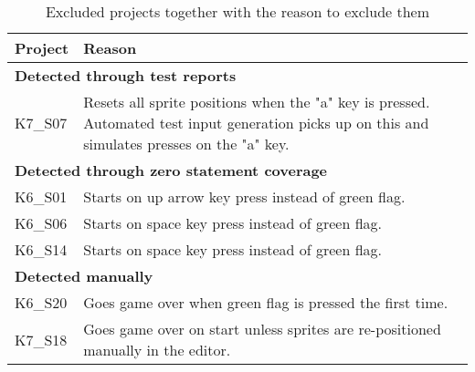 \begin{table}[htpb]
    \centering
    \scriptsize
    \begin{tabular}{lp{10.5cm}}
        \toprule
        Project & Reason                                                                           \\
        \midrule
        \multicolumn{2}{l}{\textbf{Detected through test reports}}                                 \\
        K7\_S07 & Resets all sprite positions when the "a" key is pressed.
                  Automated test input generation picks up on this and
                  simulates presses on the "a" key.                                                \\[1.4\bigskipamount]

        \multicolumn{2}{l}{\textbf{Detected through zero statement coverage}}                      \\
        K6\_S01 & Starts on up arrow key press instead of green flag.                              \\
        K6\_S06 & Starts on space key press instead of green flag.                                 \\
        K6\_S14 & Starts on space key press instead of green flag.                                 \\[\medskipamount]

        \multicolumn{2}{l}{\textbf{Detected manually}}                                             \\
        K6\_S20 & Goes game over when green flag is pressed the first time.                        \\
        K7\_S18 & Goes game over on start unless sprites are re-positioned manually in the editor. \\
        \bottomrule
    \end{tabular}
    \caption{Excluded projects together with the reason to exclude them}
    \label{tab:excluded_projects}
\end{table}

